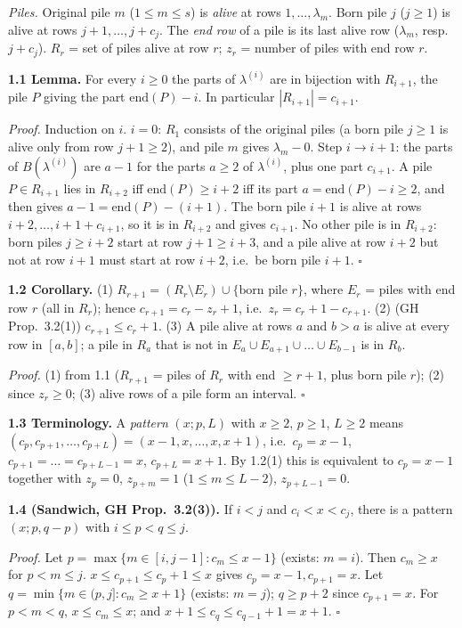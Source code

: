 \documentclass[11pt]{article}
\begin{document}
\emph{Piles.} Original pile $m$ ($1\le m\le s$) is \emph{alive} at rows $1,\dots,\lambda_m$. Born pile $j$ ($j\ge1$) is alive at rows $j+1,\dots,j+c_j$. The \emph{end row} of a pile is its last alive row ($\lambda_m$, resp.\ $j+c_j$). $R_r$ = set of piles alive at row $r$; $z_r$ = number of piles with end row $r$.

\textbf{1.1 Lemma.} For every $i\ge0$ the parts of $\lambda^{(i)}$ are in bijection with $R_{i+1}$, the pile $P$ giving the part $\mathrm{end}(P)-i$. In particular $|R_{i+1}|=c_{i+1}$.

\emph{Proof.} Induction on $i$. $i=0$: $R_1$ consists of the original piles (a born pile $j\ge1$ is alive only from row $j+1\ge2$), and pile $m$ gives $\lambda_m-0$. Step $i\to i+1$: the parts of $B(\lambda^{(i)})$ are $a-1$ for the parts $a\ge2$ of $\lambda^{(i)}$, plus one part $c_{i+1}$. A pile $P\in R_{i+1}$ lies in $R_{i+2}$ iff $\mathrm{end}(P)\ge i+2$ iff its part $a=\mathrm{end}(P)-i\ge2$, and then gives $a-1=\mathrm{end}(P)-(i+1)$. The born pile $i+1$ is alive at rows $i+2,\dots,i+1+c_{i+1}$, so it is in $R_{i+2}$ and gives $c_{i+1}$. No other pile is in $R_{i+2}$: born piles $j\ge i+2$ start at row $j+1\ge i+3$, and a pile alive at row $i+2$ but not at row $i+1$ must start at row $i+2$, i.e.\ be born pile $i+1$. $\square$

\textbf{1.2 Corollary.} (1) $R_{r+1}=(R_r\setminus E_r)\cup\{\text{born pile }r\}$, where $E_r$ = piles with end row $r$ (all in $R_r$); hence $c_{r+1}=c_r-z_r+1$, i.e.\ $z_r=c_r+1-c_{r+1}$. (2) (GH Prop.~3.2(1)) $c_{r+1}\le c_r+1$. (3) A pile alive at rows $a$ and $b>a$ is alive at every row in $[a,b]$; a pile in $R_a$ that is not in $E_a\cup E_{a+1}\cup\dots\cup E_{b-1}$ is in $R_b$.

\emph{Proof.} (1) from 1.1 ($R_{r+1}$ = piles of $R_r$ with end $\ge r+1$, plus born pile $r$); (2) since $z_r\ge0$; (3) alive rows of a pile form an interval. $\square$

\textbf{1.3 Terminology.} A \emph{pattern} $(x;p,L)$ with $x\ge2$, $p\ge1$, $L\ge2$ means $(c_p,c_{p+1},\dots,c_{p+L})=(x-1,x,\dots,x,x+1)$, i.e.\ $c_p=x-1$, $c_{p+1}=\dots=c_{p+L-1}=x$, $c_{p+L}=x+1$. By 1.2(1) this is equivalent to $c_p=x-1$ together with $z_p=0$, $z_{p+m}=1$ ($1\le m\le L-2$), $z_{p+L-1}=0$.

\textbf{1.4 (Sandwich, GH Prop.~3.2(3)).} If $i<j$ and $c_i<x<c_j$, there is a pattern $(x;p,q-p)$ with $i\le p<q\le j$.

\emph{Proof.} Let $p=\max\{m\in[i,j-1]:c_m\le x-1\}$ (exists: $m=i$). Then $c_m\ge x$ for $p<m\le j$. $x\le c_{p+1}\le c_p+1\le x$ gives $c_p=x-1,c_{p+1}=x$. Let $q=\min\{m\in(p,j]:c_m\ge x+1\}$ (exists: $m=j$); $q\ge p+2$ since $c_{p+1}=x$. For $p<m<q$, $x\le c_m\le x$; and $x+1\le c_q\le c_{q-1}+1=x+1$. $\square$
\end{document}
